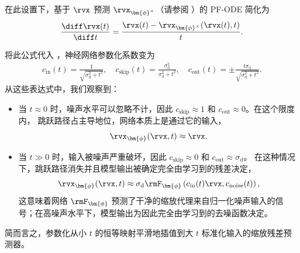 在此设置下，基于 $\rvx$ 预测 $\rvx_{\bm{\phi}^\times}$（请参阅 ）的 PF-ODE 简化为
\begin{align*}
    \frac{\diff \rvx(t)}{\diff t} = \frac{\rvx(t) - \rvx_{\bm{\phi}^\times}(\rvx(t), t)}{t}.
\end{align*}

将此公式代入 ，神经网络参数化系数变为
\begin{align}\label{eq:edm-simple-coefficients}
    c_{\mathrm{in}}(t) = \frac{1}{\sqrt{\sigma_{\mathrm{d}}^2 + t^2}}, \quad
    c_{\mathrm{skip}}(t) = \frac{\sigma_{\mathrm{d}}^2}{\sigma_{\mathrm{d}}^2 + t^2}, \quad
    c_{\mathrm{out}}(t) = \pm \frac{t \sigma_{\mathrm{d}}}{\sqrt{\sigma_{\mathrm{d}}^2 + t^2}}.
\end{align}
从这些表达式中，我们观察到：
\begin{itemize}
    \item 当 $t \approx 0$ 时，噪声水平可以忽略不计，因此
    $c_{\mathrm{skip}} \approx 1$ 和 $c_{\mathrm{out}} \approx 0$。在这个限度内，
    跳跃路径占主导地位，网络本质上是通过它的输入，
    \[
    \rvx_{\bm{\phi}}(\rvx, t) \approx \rvx.
    \]
    \item 当 $t \gg 0$ 时，输入被噪声严重破坏，因此
    $c_{\mathrm{skip}} \approx 0$ 和 $c_{\mathrm{out}} \approx \sigma_{\mathrm{d}}$。
    在这种情况下，跳跃路径消失并且模型输出被确定完全由学习到的残差决定，
    \[
    \rvx_{\bm{\phi}}(\rvx, t) \approx \sigma_{\mathrm{d}} \rmF_{\bm{\phi}}\left(c_{\mathrm{in}}(t)\rvx, c_{\mathrm{noise}}(t)\right),
    \]
    这意味着网络 $\rmF_{\bm{\phi}}$ 预测了干净的缩放代理来自归一化噪声输入的信号；在高噪声水平下，模型输出为因此完全由学习到的去噪函数决定。
\end{itemize}
简而言之，参数化从小 $t$ 的恒等映射平滑地插值到大 $t$ 标准化输入的缩放残差预测器。
